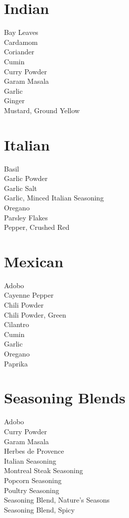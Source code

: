 \documentclass[twocolumn]{article}
\begin{document}
\section*{Indian}
Bay Leaves\\
Cardamom\\
Coriander\\
Cumin\\
Curry Powder\\
Garam Masala\\
Garlic\\
Ginger\\
Mustard, Ground Yellow\\

\section*{Italian}
Basil\\
Garlic Powder\\
Garlic Salt\\
Garlic, Minced
Italian Seasoning\\
Oregano\\
Parsley Flakes\\
Pepper, Crushed Red\\

\section*{Mexican}
Adobo\\
Cayenne Pepper\\
Chili Powder\\
Chili Powder, Green\\
Cilantro\\
Cumin\\
Garlic\\
Oregano\\
Paprika\\

\section*{Seasoning Blends}
Adobo\\
Curry Powder\\
Garam Masala\\
Herbes de Provence\\
Italian Seasoning\\
Montreal Steak Seasoning\\
Popcorn Seasoning\\
Poultry Seasoning\\
Seasoning Blend, Nature's Seasons\\
Seasoning Blend, Spicy\\
\end{document}
